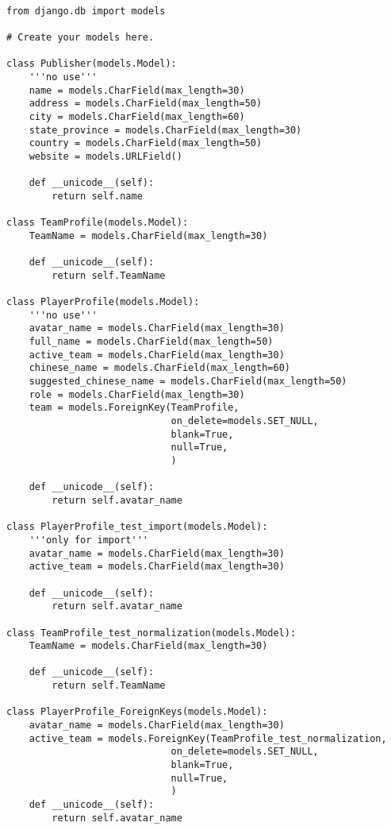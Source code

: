 \documentclass[12pt]{article}
\begin{document}
\begin{mdframed}[leftline=false, rightline=false,backgroundcolor=bg]
\begin{verbatim}

from django.db import models

# Create your models here.

class Publisher(models.Model):
    '''no use'''
    name = models.CharField(max_length=30)
    address = models.CharField(max_length=50)
    city = models.CharField(max_length=60)
    state_province = models.CharField(max_length=30)
    country = models.CharField(max_length=50)
    website = models.URLField()
    
    def __unicode__(self):
        return self.name
   
class TeamProfile(models.Model):
    TeamName = models.CharField(max_length=30)

    def __unicode__(self):
        return self.TeamName
        
class PlayerProfile(models.Model):
    '''no use'''
    avatar_name = models.CharField(max_length=30)
    full_name = models.CharField(max_length=50)
    active_team = models.CharField(max_length=30)
    chinese_name = models.CharField(max_length=60)
    suggested_chinese_name = models.CharField(max_length=50)
    role = models.CharField(max_length=30)
    team = models.ForeignKey(TeamProfile,
                             on_delete=models.SET_NULL,
                             blank=True,
                             null=True,
                             )
    
    def __unicode__(self):
        return self.avatar_name

class PlayerProfile_test_import(models.Model):
    '''only for import'''
    avatar_name = models.CharField(max_length=30)
    active_team = models.CharField(max_length=30)
    
    def __unicode__(self):
        return self.avatar_name

class TeamProfile_test_normalization(models.Model):
    TeamName = models.CharField(max_length=30)

    def __unicode__(self):
        return self.TeamName
        
class PlayerProfile_ForeignKeys(models.Model):
    avatar_name = models.CharField(max_length=30)
    active_team = models.ForeignKey(TeamProfile_test_normalization,
                             on_delete=models.SET_NULL,
                             blank=True,
                             null=True,
                             )
    def __unicode__(self):
        return self.avatar_name
        

\end{verbatim}
\end{mdframed}
\end{document}
